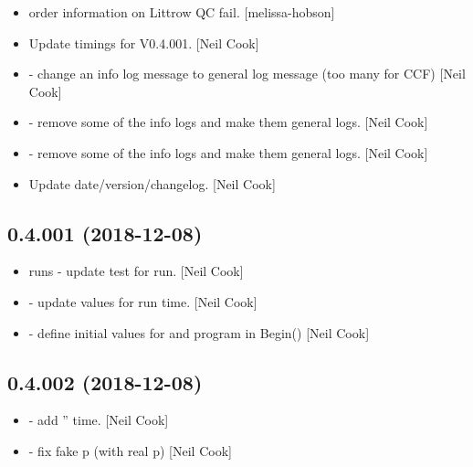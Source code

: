\documentclass[a4paper,10pt,english]{report}
\begin{document}
\begin{itemize}
\item {} 
 order information on Littrow QC fail. {[}melissa-hobson{]}

\item {} 
Update timings for V0.4.001. {[}Neil Cook{]}

\item {} 
 - change an info log message to general log message (too
many for CCF) {[}Neil Cook{]}

\item {} 
 - remove some of the info logs and make them general
logs. {[}Neil Cook{]}

\item {} 
 - remove some of the info logs and make them general
logs. {[}Neil Cook{]}

\item {} 
Update date/version/changelog. {[}Neil Cook{]}

\end{itemize}


\subsection{0.4.001 (2018-12-08)}
\label{\detokenize{misc/changelog:id244}}\begin{itemize}
\item {} 
 runs - update test for run. {[}Neil Cook{]}

\item {} 
 - update values for run time. {[}Neil Cook{]}

\item {} 
 - define initial values for  and program in
Begin() {[}Neil Cook{]}

\end{itemize}


\subsection{0.4.002 (2018-12-08)}
\label{\detokenize{misc/changelog:id245}}\begin{itemize}
\item {} 
 - add ” time. {[}Neil Cook{]}

\item {} 
 - fix fake p (with real p) {[}Neil Cook{]}

\end{itemize}
\end{document}
